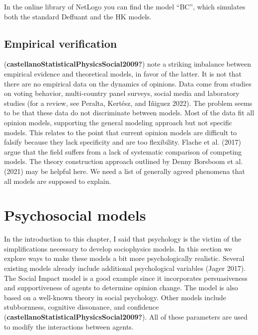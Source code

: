 \documentclass[
  a4paper,
  DIV=11,
  numbers=noendperiod]{scrreprt}
\begin{document}
In the online library of NetLogo you can find the model ``BC'', which
simulates both the standard Deffuant and the HK models.

\hypertarget{sec-Empirical-verification}{%
\subsection{Empirical verification}\label{sec-Empirical-verification}}

(\textbf{castellanoStatisticalPhysicsSocial2009?}) note a striking
imbalance between empirical evidence and theoretical models, in favor of
the latter. It is not that there are no empirical data on the dynamics
of opinions. Data come from studies on voting behavior, multi-country
panel surveys, social media and laboratory studies (for a review, see
Peralta, Kertész, and Iñiguez 2022). The problem seems to be that these
data do not discriminate between models. Most of the data fit all
opinion models, supporting the general modeling approach but not
specific models. This relates to the point that current opinion models
are difficult to falsify because they lack specificity and are too
flexibility. Flache et al. (2017) argue that the field suffers from a
lack of systematic comparison of competing models. The theory
construction approach outlined by Denny Borsboom et al. (2021) may be
helpful here. We need a list of generally agreed phenomena that all
models are supposed to explain.

\hypertarget{sec-Psychosocial-models}{%
\section{Psychosocial models}\label{sec-Psychosocial-models}}

In the introduction to this chapter, I said that psychology is the
victim of the simplifications necessary to develop sociophysics models.
In this section we explore ways to make these models a bit more
psychologically realistic. Several existing models already include
additional psychological variables (Jager 2017). The Social Impact model
is a good example since it incorporates persuasiveness and
supportiveness of agents to determine opinion change. The model is also
based on a well-known theory in social psychology. Other models include
stubbornness, cognitive dissonance, and confidence
(\textbf{castellanoStatisticalPhysicsSocial2009?}). All of these
parameters are used to modify the interactions between agents.
\end{document}
